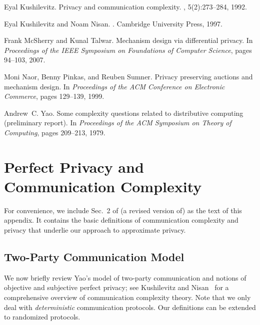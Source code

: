 \documentclass{article}
\theoremstyle{theorem}
\theoremstyle{definition}
\theoremstyle{remark}
\begin{document}
\begin{thebibliography}{10}
Eyal Kushilevitz.
\newblock Privacy and communication complexity.
, 5(2):273--284, 1992.

Eyal Kushilevitz and Noam Nisan.
.
\newblock Cambridge University Press, 1997.

Frank McSherry and Kunal Talwar.
\newblock Mechanism design via differential privacy.
\newblock In {\em Proceedings of the IEEE Symposium on Foundations of Computer
  Science}, pages 94--103, 2007.

Moni Naor, Benny Pinkas, and Reuben Sumner.
\newblock Privacy preserving auctions and mechanism design.
\newblock In {\em Proceedings of the ACM Conference on Electronic Commerce},
  pages 129--139, 1999.

Andrew~C. Yao.
\newblock Some complexity questions related to distributive computing
  (preliminary report).
\newblock In {\em Proceedings of the ACM Symposium on Theory of Computing},
  pages 209--213, 1979.

\end{thebibliography}

\appendix

\section{Perfect Privacy and Communication Complexity}\label{ap:model}

For convenience, we include Sec.~2 of (a revised version of) \cite{fjs09tr14} as the text of this appendix.
It contains the basic definitions of communication complexity and privacy that underlie our approach to
approximate privacy.

\subsection{Two-Party Communication Model}\label{subsec-Yao}

We now briefly review Yao's model of two-party communication and
notions of objective and subjective perfect privacy; see Kushilevitz
and Nisan~\cite{KN97} for a comprehensive overview of communication
complexity theory.  Note that we only deal with \emph{deterministic}
communication protocols. Our definitions can be extended to
randomized protocols.
\end{document}

